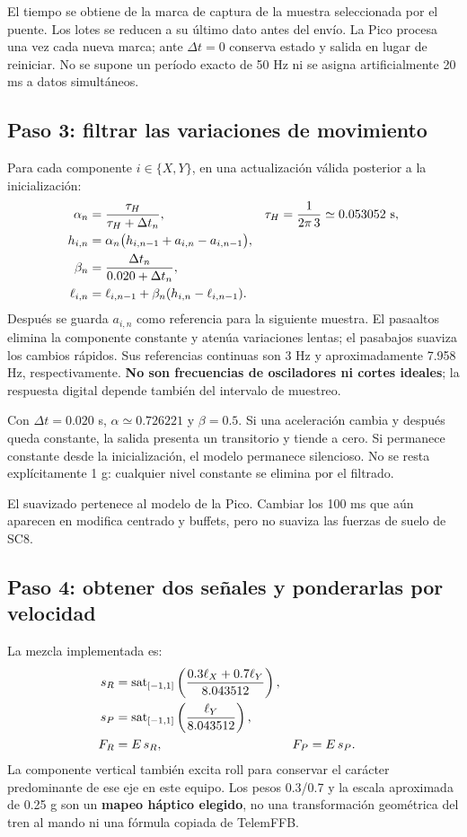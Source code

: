 El tiempo se obtiene de la marca de captura de la muestra seleccionada por el puente. Los lotes se reducen a su último dato antes del envío. La Pico procesa una vez cada nueva marca; ante $\Delta t=0$ conserva estado y salida en lugar de reiniciar. No se supone un período exacto de 50 Hz ni se asigna artificialmente 20 ms a datos simultáneos.

\subsection{Paso 3: filtrar las variaciones de movimiento}
Para cada componente $i\in\{X,Y\}$, en una actualización válida posterior a la inicialización:
\begin{align}
\alpha_n&=\frac{\tau_H}{\tau_H+\Delta t_n}, & \tau_H&=\frac{1}{2\pi\,3}\simeq0.053052\ {\rm s},\\
h_{i,n}&=\alpha_n\bigl(h_{i,n-1}+a_{i,n}-a_{i,n-1}\bigr),\\
\beta_n&=\frac{\Delta t_n}{0.020+\Delta t_n},\\
\ell_{i,n}&=\ell_{i,n-1}+\beta_n(h_{i,n}-\ell_{i,n-1}).
\label{eq:ground-filter}
\end{align}
Después se guarda $a_{i,n}$ como referencia para la siguiente muestra. El pasaaltos elimina la componente constante y atenúa variaciones lentas; el pasabajos suaviza los cambios rápidos. Sus referencias continuas son 3 Hz y aproximadamente 7.958 Hz, respectivamente. \textbf{No son frecuencias de osciladores ni cortes ideales}; la respuesta digital depende también del intervalo de muestreo.

Con $\Delta t=0.020$ s, $\alpha\simeq0.726221$ y $\beta=0.5$. Si una aceleración cambia y después queda constante, la salida presenta un transitorio y tiende a cero. Si permanece constante desde la inicialización, el modelo permanece silencioso. No se resta explícitamente 1 g: cualquier nivel constante se elimina por el filtrado.

El suavizado pertenece al modelo de la Pico. Cambiar los 100 ms que aún aparecen en  modifica centrado y buffets, pero no suaviza las fuerzas de suelo de SC8.

\subsection{Paso 4: obtener dos señales y ponderarlas por velocidad}
La mezcla implementada es:
\begin{align}
s_R&=\operatorname{sat}_{[-1,1]}\left(\frac{0.3\ell_X+0.7\ell_Y}{8.043512}\right),\\
s_P&=\operatorname{sat}_{[-1,1]}\left(\frac{\ell_Y}{8.043512}\right),\\
F_R&=E\,s_R, & F_P&=E\,s_P.
\label{eq:ground-signals}
\end{align}
La componente vertical también excita roll para conservar el carácter predominante de ese eje en este equipo. Los pesos 0.3/0.7 y la escala aproximada de 0.25 g son un \textbf{mapeo háptico elegido}, no una transformación geométrica del tren al mando ni una fórmula copiada de TelemFFB.

